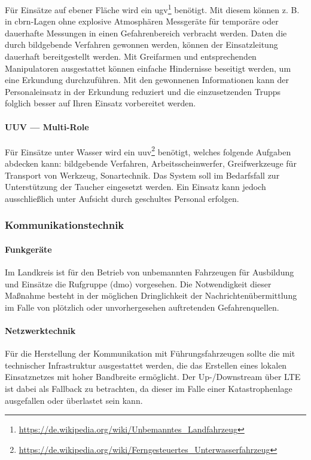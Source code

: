 Für Einsätze auf ebener Fläche wird ein \ac{ugv}\footnote{\url{https://de.wikipedia.org/wiki/Unbemanntes_Landfahrzeug}} benötigt. Mit diesem können z. B. in \acs{cbrn}-Lagen ohne explosive Atmosphären Messgeräte für temporäre oder dauerhafte Messungen in einen Gefahrenbereich verbracht werden. Daten die durch bildgebende Verfahren gewonnen werden, können der Einsatzleitung dauerhaft bereitgestellt werden. Mit Greifarmen und entsprechenden Manipulatoren ausgestattet können einfache Hindernisse beseitigt werden, um eine Erkundung durchzuführen.
Mit den gewonnenen Informationen kann der Personaleinsatz in der Erkundung reduziert und die einzusetzenden Trupps folglich besser auf Ihren Einsatz vorbereitet werden.

\paragraph{UUV — Multi-Role}

Für Einsätze unter Wasser wird ein \ac{uuv}\footnote{\url{https://de.wikipedia.org/wiki/Ferngesteuertes_Unterwasserfahrzeug}} benötigt, welches folgende Aufgaben abdecken kann: bildgebende Verfahren, Arbeitsscheinwerfer, Greifwerkzeuge für Transport von Werkzeug, Sonartechnik. Das System soll im Bedarfsfall zur Unterstützung der Taucher eingesetzt werden. Ein Einsatz kann jedoch ausschließlich unter Aufsicht durch geschultes Personal erfolgen.

\subsubsection{Kommunikationstechnik}
\paragraph{Funkgeräte}

Im Landkreis ist für den Betrieb von unbemannten Fahrzeugen für Ausbildung und Einsätze die Rufgruppe \dmoGroup{} (\acs{dmo}) vorgesehen.
Die Notwendigkeit dieser Maßnahme besteht in der möglichen Dringlichkeit der Nachrichtenübermittlung im Falle von plötzlich oder unvorhergesehen auftretenden Gefahrenquellen.

\paragraph{Netzwerktechnik}

Für die Herstellung der Kommunikation mit Führungsfahrzeugen sollte die \callee{} mit technischer Infrastruktur ausgestattet werden, die das Erstellen eines lokalen Einsatznetzes mit hoher Bandbreite ermöglicht. Der Up-/Downstream über LTE ist dabei als Fallback zu betrachten, da dieser im Falle einer Katastrophenlage ausgefallen oder überlastet sein kann.


